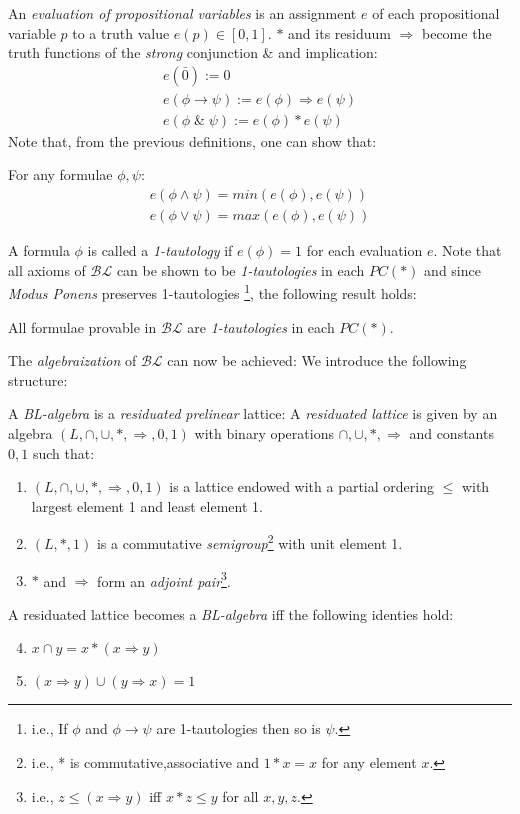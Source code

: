  An \emph{evaluation of propositional variables} is an assignment $e$ of each propositional variable $p$ to a truth value $e(p) \in [0,1]$. 
 \newline 
 $*$ and its residuum $\Rightarrow$ become the truth functions of the \emph{strong} conjunction \& and implication:
   \begin{gather*}
   		e(\bar{0}):= 0 \\
   		e(\phi \rightarrow \psi) := e(\phi) \Rightarrow e(\psi) \\
   		e(\phi \;\&\; \psi) := e(\phi)*e(\psi)
   \end{gather*}
 Note that, from the previous definitions, one can show that:
 \begin{lem} For any formulae $\phi, \psi$:
 	\begin{gather*}
 		e(\phi \land \psi) = min( e(\phi),e(\psi) ) \\
 		e(\phi \lor \psi) = max( e(\phi),e(\psi) )
 	\end{gather*}
 \end{lem}
 A formula $\phi$ is called a \emph{1-tautology} if $e(\phi)=1$ for each evaluation $e$.
 \newline
 Note that all axioms of $\mathcal{BL}$ can be shown to be \emph{1-tautologies} in each $PC(*)$ and since \emph{Modus Ponens} preserves 1-tautologies \footnote{i.e., If $\phi$ and $\phi \rightarrow \psi$ are 1-tautologies then so is $\psi$.}, the following result holds:
 \begin{lem}
 	All formulae provable in $\mathcal{BL}$ are \emph{1-tautologies} in each $PC(*)$.
 \end{lem}
 The \emph{algebraization} of $\mathcal{BL}$ can now be achieved: \newline
 We introduce the following structure:
 \begin{definition}[BL-algebra]
 	A \emph{BL-algebra} is a \emph{residuated} \emph{prelinear} lattice:\newline
 	A \emph{residuated lattice} is given by an algebra $(L,\cap,\cup,*,\Rightarrow,0,1)$ with binary operations $\cap,\cup,*,\Rightarrow$ and constants $0,1$ such that:
 	\begin{enumerate}[label=(\roman*)]
 		\item $(L,\cap,\cup,*,\Rightarrow,0,1)$ is a lattice endowed with a partial ordering $\leq$ with largest element 1 and least element 1.
 		\item $(L,*,1)$ is a commutative \emph{semigroup}\footnote{i.e., * is commutative,associative and $1*x=x$ for any element $x$.} with unit element 1.
 		\item $*$ and $\Rightarrow$ form an \emph{adjoint pair}\footnote{i.e., $z \leq (x\Rightarrow y)$ iff $x*z \leq y$ for all $x,y,z$.}. 
 	\end{enumerate}
 	A residuated lattice becomes a \emph{BL-algebra} iff the following identies hold:
 	\begin{enumerate}[label=(\roman*)]
 		\setcounter{enumi}{3}
 		\item $x \cap y = x * (x \Rightarrow y)$
 		\item $(x \Rightarrow y) \cup (y \Rightarrow x) =1$
 	\end{enumerate}
 \end{definition}
 
